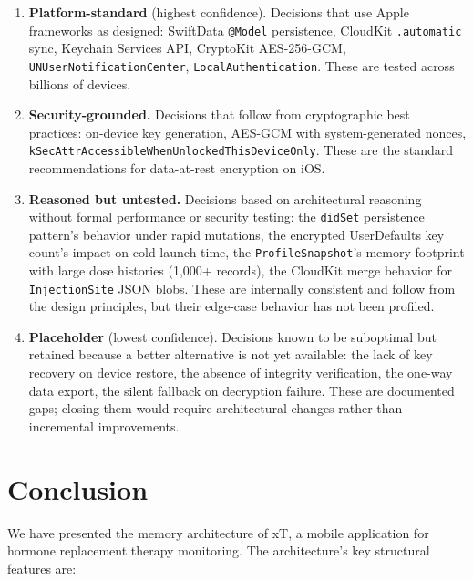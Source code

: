 \documentclass[11pt,a4paper]{article}
\newcommand{\code}[1]{\texttt{\small #1}}
\begin{document}
\begin{enumerate}[nosep,leftmargin=1.4em]
\item \textbf{Platform-standard} (highest confidence). Decisions that use
  Apple frameworks as designed: SwiftData \code{@Model} persistence,
  CloudKit \code{.automatic} sync, Keychain Services API,
  CryptoKit AES-256-GCM, \code{UNUserNotificationCenter},
  \code{LocalAuthentication}. These are tested across billions of devices.
\item \textbf{Security-grounded.} Decisions that follow from cryptographic
  best practices: on-device key generation, AES-GCM with system-generated
  nonces, \code{kSecAttrAccessibleWhenUnlockedThisDeviceOnly}. These are
  the standard recommendations for data-at-rest encryption on iOS.
\item \textbf{Reasoned but untested.} Decisions based on architectural
  reasoning without formal performance or security testing: the
  \code{didSet} persistence pattern's behavior under rapid mutations, the
  encrypted UserDefaults key count's impact on cold-launch time, the
  \code{ProfileSnapshot}'s memory footprint with large dose histories
  (1,000+ records), the CloudKit merge behavior for
  \code{InjectionSite} JSON blobs. These are internally consistent and
  follow from the design principles, but their edge-case behavior has not
  been profiled.
\item \textbf{Placeholder} (lowest confidence). Decisions known to be
  suboptimal but retained because a better alternative is not yet available:
  the lack of key recovery on device restore, the absence of integrity
  verification, the one-way data export, the silent fallback on decryption
  failure. These are documented gaps; closing them would require
  architectural changes rather than incremental improvements.
\end{enumerate}

\section{Conclusion}
\label{sec:conclusion}

We have presented the memory architecture of xT, a mobile application for
hormone replacement therapy monitoring. The architecture's key structural
features are:
\end{document}

